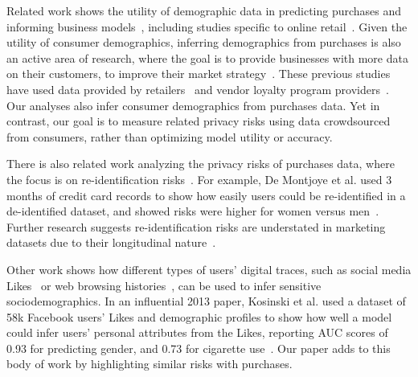 Related work shows the utility of demographic data in predicting purchases and informing business models~\cite{islam2022}, including studies specific to online retail~\cite{hood2020, dominici2021, hamad2019}. Given the utility of consumer demographics, inferring demographics from purchases is also an active area of research, where the goal is to provide businesses with more data on their customers, to improve their market strategy~\cite{wang2016, kim2019, jiang2019}. These previous studies have used data provided by retailers~\cite{wang2016} and vendor loyalty program providers~\cite{kim2019, jiang2019}.
Our analyses also infer consumer demographics from purchases data. 
Yet in contrast, our goal is to measure related privacy risks using data crowdsourced from consumers, rather than optimizing model utility or accuracy.

There is also related work analyzing the privacy risks of purchases data, where the focus is on re-identification risks~\cite{deMontjoye2015, li2023}.
For example, De Montjoye et al. used 3 months of credit card records to show how easily users could be re-identified in a de-identified dataset, and showed risks were higher for women versus men~\cite{deMontjoye2015}. Further research suggests re-identification risks are understated in marketing datasets due to their longitudinal nature~\cite{li2023}.

Other work shows how different types of users' digital traces, such as social media Likes~\cite{kosinski2013} or web browsing histories~\cite{ourFlocPaper}, can be used to infer sensitive sociodemographics. In an influential 2013 paper, Kosinski et al. used a dataset of 58k Facebook users' Likes and demographic profiles to show how well a model could infer users' personal attributes from the Likes, reporting AUC scores of 0.93 for predicting gender, and 0.73 for cigarette use~\cite{kosinski2013}. Our paper adds to this body of work by highlighting similar risks with purchases.